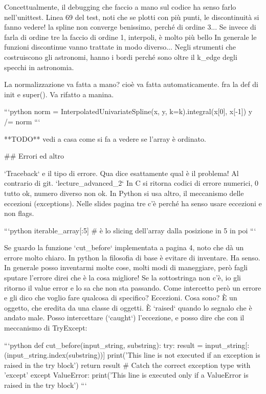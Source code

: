 \documentclass[10pt, a4paper, twosided, titlepage, draft]{book}
\begin{document}
Concettualmente, il debugging che faccio a mano sul codice ha senso farlo nell'unittest.
Linea 69 del test, noti che se plotti con più punti, le discontinuità si fanno vedere! la spline non converge benissimo, perché di ordine 3...
Se invece di farla di ordine tre la faccio di ordine 1, interpoli, è molto più bello
In generale le funzioni discontinue vanno trattate in modo diverso... 
Negli strumenti che costruiscono gli astronomi, hanno i bordi perché sono oltre il k_edge degli specchi in astronomia.

La normalizzazione va fatta a mano? cioè va fatta automaticamente.
fra la def di init e super(). Va rifatto a manina.

```python
norm = InterpolatedUnivariateSpline(x, y, k=k).integral(x[0], x[-1])
y /= norm
```

**TODO** vedi a casa come si fa a vedere se l'array è ordinato.

## Errori ed altro

`Traceback` e il tipo di errore.
Qua dice esattamente qual è il problema! Al contrario di git.
`lecture_advanced_2`
In C si ritorna codici di errore numerici, 0 tutto ok, numero diverso non ok.
In Python si usa altro, il meccanismo delle eccezioni (exceptions).
Nelle slides pagina tre c'è perché ha senso usare eccezioni e non flags.

```python
iterable_array[:5] # è lo slicing dell'array dalla posizione in 5 in poi
```

Se guardo la funzione `cut_before` implementata a pagina 4, noto che dà un errore molto chiaro.
In python la filosofia di base è evitare di inventare. Ha senso. In generale posso inventarmi molte cose, molti modi di maneggiare, però fagli sputare l'errore direi che è la cosa migliore! Se la sottostringa non c'è, io gli ritorno il value error e lo sa che non sta passando.
Come intercetto però un errore e gli dico che voglio fare qualcosa di specifico?
Eccezioni.
Cosa sono? È un oggetto, che eredita da una classe di oggetti.
È `raised` quando lo segnalo che è andato male.
Posso intercettare (`caught`) l'eccezione, e posso dire che con il meccanismo di TryExcept:

```python
def cut_before(input_string, substring):
try:
result = input_string[:(input_string.index(substring))]
print(’This line is not executed if an exception is raised in the try block’)
return result
# Catch the correct exception type with ’except’
except ValueError:
print(’This line is executed only if a ValueError is raised in the try block’)
```
\end{document}
